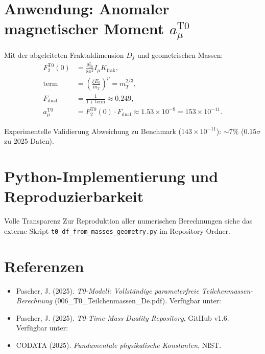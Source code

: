 	\section{Anwendung: Anomaler magnetischer Moment $a_{\mu}^{\text{T0}}$}
	\label{sec:anwendung_g2}
	
	Mit der abgeleiteten Fraktaldimension $D_f$ und geometrischen Massen:
	\begin{align}
		F_2^{\text{T0}}(0) &= \frac{g_{T0}^2}{8 \pi^2} I_{\mu} K_{\text{frak}}, \label{eq:F2} \\
		\text{term} &= \left( \frac{\xi E_0}{m_T} \right)^p = m_T^{2/3}, \label{eq:term} \\
		F_{\text{dual}} &= \frac{1}{1 + \text{term}} \approx 0.249, \label{eq:Fdual} \\
		a_{\mu}^{\text{T0}} &= F_2^{\text{T0}}(0) \cdot F_{\text{dual}} \approx 1.53 \times 10^{-9} = 153 \times 10^{-11}. \label{eq:amu}
	\end{align}
	
	\begin{result}{Experimentelle Validierung}{}
		Abweichung zu Benchmark ($143 \times 10^{-11}$): $\sim 7\%$ ($0.15\sigma$ zu 2025-Daten).
	\end{result}
	
	\section{Python-Implementierung und Reproduzierbarkeit}
	\label{sec:python_implementierung}
	
	\begin{important}{Volle Transparenz}{}
		Zur Reproduktion aller numerischen Berechnungen siehe das externe Skript \texttt{t0\_df\_from\_masses\_geometry.py} im Repository-Ordner.
	\end{important}
	
	\section{Referenzen}
	\label{sec:referenzen}
	
	\begin{itemize}
		\item Pascher, J. (2025). \emph{T0-Modell: Vollständige parameterfreie Teilchenmassen-Berechnung} (006\_T0\_Teilchenmassen\_De.pdf). Verfügbar unter:\\ 
		
		\item Pascher, J. (2025). \emph{T0-Time-Mass-Duality Repository}, GitHub v1.6. Verfügbar unter: 
		
		\item CODATA (2025). \emph{Fundamentale physikalische Konstanten}, NIST.
	\end{itemize}
	